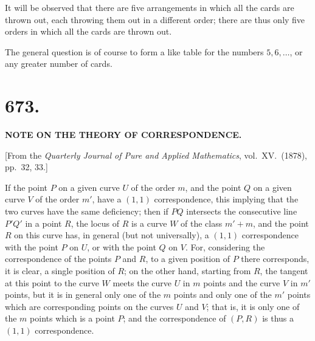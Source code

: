 \documentclass[11pt,a4paper]{article}
\begin{document}
\medskip

It will be observed that there are five arrangements in which all the cards are thrown out, each throwing them out in a different order; there are thus only five orders in which all the cards are thrown out.

\medskip

The general question is of course to form a like table for the numbers $5, 6, \ldots$, or any greater number of cards.

\newpage



\section*{673.}

\begin{center}
\textbf{NOTE ON THE THEORY OF CORRESPONDENCE.}
\end{center}

\medskip

\begin{center}
[From the \emph{Quarterly Journal of Pure and Applied Mathematics}, vol.~XV.\ (1878), pp.~32, 33.]
\end{center}

\medskip

\noindent If the point $P$ on a given curve $U$ of the order $m$, and the point $Q$ on a given curve $V$ of the order $m'$, have a $(1, 1)$ correspondence, this implying that the two curves have the same deficiency; then if $PQ$ intersects the consecutive line $P'Q'$ in a point $R$, the locus of $R$ is a curve $W$ of the class $m' + m$, and the point $R$ on this curve has, in general (but not universally), a $(1, 1)$ correspondence with the point $P$ on $U$, or with the point $Q$ on $V$. For, considering the correspondence of the points $P$ and $R$, to a given position of $P$ there corresponds, it is clear, a single position of $R$; on the other hand, starting from $R$, the tangent at this point to the curve $W$ meets the curve $U$ in $m$ points and the curve $V$ in $m'$ points, but it is in general only one of the $m$ points and only one of the $m'$ points which are corresponding points on the curves $U$ and $V$; that is, it is only one of the $m$ points which is a point $P$; and the correspondence of $(P, R)$ is thus a $(1, 1)$ correspondence.
\end{document}
